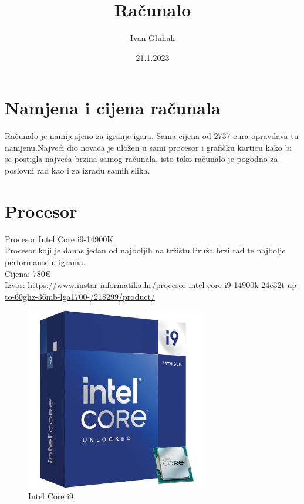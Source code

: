 \documentclass{report}
\begin{document}
\title{Računalo}
\author{Ivan Gluhak}
\date{21.1.2023}
\maketitle
\tableofcontents
\listoffigures

\chapter{Namjena i cijena računala}
Računalo je namijenjeno za igranje igara. Sama cijena od 2737 eura opravdava tu namjenu.Najveći dio novaca je uložen u sami procesor i grafičku karticu kako bi se postigla najveća brzina samog računala, isto tako računalo je pogodno za poslovni rad kao i za izradu samih slika.
 
\chapter{Procesor}
Procesor Intel Core i9-14900K 
\\ Procesor koji je danas jedan od najboljih na tržištu.Pruža brzi rad te najbolje performanse u igrama.
\\Cijena: 780€
\\Izvor:  \url{https://www.instar-informatika.hr/procesor-intel-core-i9-14900k-24c32t-up-to-60ghz-36mb-lga1700-/218299/product/}
\begin{figure}[h]
\includegraphics[width=8cm]{slike/procesor.jpg}
\caption{Intel Core i9}
\end{figure}
\end{document}
